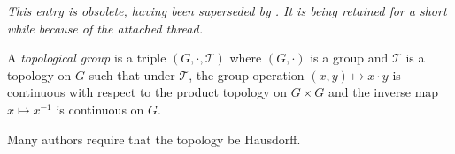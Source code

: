 \documentclass{article}
\begin{document}

{\it This entry is obsolete, having been superseded by . It is being retained for a short while because of the attached thread.}

A \emph{topological group} is a triple $(G,\cdot,\mathcal{T})$ where $(G,\cdot)$ is a group and $\mathcal{T}$ is a topology on $G$ such that under $\mathcal{T}$, the group operation $(x,y)\mapsto x\cdot y$ is continuous with respect to the product topology on $G\times G$ and the inverse map $x\mapsto x^{-1}$ is continuous on $G$.

Many authors require that the topology be Hausdorff.
\end{document}
